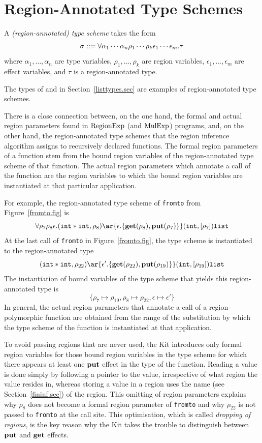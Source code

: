 \documentclass[12pt]{book}
\begin{document}
\section{Region-Annotated Type Schemes}
\label{regtych.sec}
A 
%
%
{\em (region-annotated) type scheme\/} takes the form
$$\sigma::=\forall\alpha_1\cdots\alpha_n\rho_1\cdots\rho_k\epsilon_1\cdots\epsilon_m.\tau$$
where $\alpha_1,\ldots,\alpha_n$ are type variables,
$\rho_1,\ldots,\rho_k$ are region variables,
$\epsilon_1,\ldots,\epsilon_m$ are 
%
effect variables, and $\tau$ is a region-annotated type.

The types of  and \boxml{::} in Section~\ref{listtypes.sec} are examples of 
%
region-annotated type schemes. 

There is a close connection between, on the one hand, the formal and
actual 
%
region parameters found in $\hbox{\rm RegionExp}$ (and $\hbox{\rm MulExp}$) programs, and, on
the other hand, the region-annotated type schemes that the region inference
algorithm assigns to recursively declared functions. The formal region
parameters of a function stem from the bound region variables of the
region-annotated type scheme of that function.  The actual region parameters
which annotate a call of the function are the region variables to
which the bound region variables are instantiated at that particular
application.

For example, the region-annotated type scheme of {\tt fromto} from Figure~\ref{fromto.fig} is
$$\forall\rho_7\rho_8\epsilon.(\boxml{int} \ast \boxml{int},\rho_8)\ar{\epsilon.\{
\Get(\rho_8),\Put(\rho_7)\}} (\boxml{int},[\rho_7])\boxml{list}$$
At the last call of {\tt fromto} in Figure~\ref{fromto.fig},
the type scheme is instantiated to the region-annotated type
$$(\boxml{int} \ast \boxml{int},\rho_{22})\ar{\epsilon'.\{
\Get(\rho_{22}),\Put(\rho_{19})\}} (\boxml{int},[\rho_{19}])\boxml{list}$$
The instantiation of bound variables of the type scheme that yields this region-annotated type is
$$\{\rho_7\mapsto\rho_{19}, \rho_8\mapsto\rho_{22}, \epsilon\mapsto\epsilon'\}$$
In general, the actual region parameters that annotate a call of a region-polymorphic function are obtained from
the range of the substitution by which the type scheme of the function is  instantiated at that
application.

To avoid passing regions that are never used, the Kit introduces only 
formal region variables for those bound region variables in the type scheme
for which there appears at least one $\mathop{\bf put}\nolimits$ effect in the type of the function.
Reading a value is done simply by following a pointer to the value, irrespective
of what region the value resides in, whereas storing a value in a region uses the
name (see Section~\ref{fininf.sec}) of the region.
This omitting of region parameters explains why $\rho_8$ does not become a formal region parameter of {\tt fromto} and why
$\rho_{22}$ is not passed to {\tt fromto} at the call site. This optimisation,
which is called 
%
{\em dropping of regions}, is the key reason why the Kit takes the
trouble to distinguish between $\mathop{\bf put}\nolimits$ and $\mathop{\bf get}\nolimits$
effects\label{bother-to-distinguish-get-n-put}.
\end{document}
